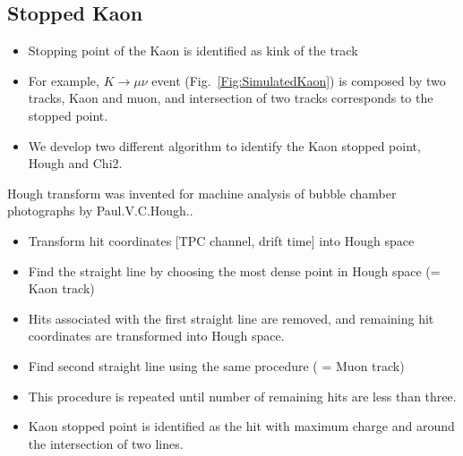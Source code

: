 \subsection{Stopped Kaon}
\label{Sec:Kaon}
\begin{itemize}
\item Stopping point of the Kaon is identified as kink of the track
\item For example, $K\to\mu\nu$ event (Fig.~\ref{Fig:SimulatedKaon}) is composed by two tracks, Kaon and muon, and intersection of two tracks corresponds to the stopped point.
\item We develop two different algorithm to identify the Kaon stopped point, Hough and Chi2.
\end{itemize}

Hough transform was invented for machine analysis of bubble chamber photographs by Paul.V.C.Hough.\cite{3069654}.
\begin{itemize}
\item Transform hit coordinates [TPC channel, drift time] into Hough space
\item Find the straight line by choosing the most dense point in Hough space (= Kaon track)
\item Hits associated with the first straight line are removed, and remaining hit coordinates are transformed into Hough space.
\item Find second straight line using the same procedure ( = Muon track)
\item This procedure is repeated until number of remaining hits are less than three.
\item Kaon stopped point is identified as the hit with maximum charge and around the intersection of two lines.
\end{itemize}


